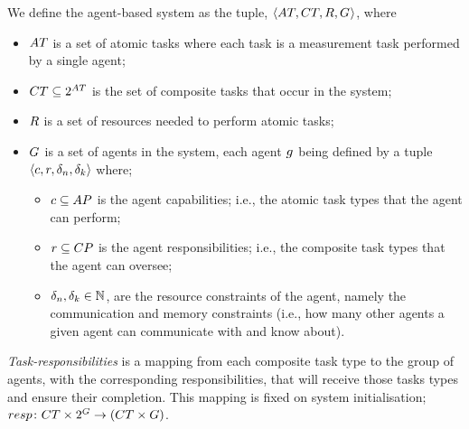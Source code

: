We define the agent-based system as the tuple, $\langle 
	\setAtomicTask{}{},
	\setCompositeTask{}{},
	\setResource{}{},
	\setAgents{}{}
\rangle$, where
\begin{itemize}
	\item $\setAtomicTask{}{}$ is a set of atomic tasks where each task is a measurement task performed by a single agent;
	\item $\setCompositeTask{}{} \subseteq \powerSetSymbol{\setAtomicTask{}{}}{}{}$ is the set of composite tasks that occur in the system;
	\item $\setResource{}{}$ is a set of resources needed to perform atomic tasks;
	\item $G_{}^{}$ is a set of agents in the system, each agent $g_{}^{}$ being defined by a tuple $\langle c,r, \delta_n, \delta_k \rangle$ where;
	\begin{itemize}
		\item $\varAgentCapability{}{}\subseteq \setAtomicTaskType{}{}$ is the agent capabilities; i.e., the atomic task types that the agent can perform;
		 \item $\varAgentResponsiblity{}{} \subseteq \setCompositeTaskType{}{}$ is the agent responsibilities; i.e., the composite task types that the agent can oversee;
		\item $\delta_n, \delta_k \in \mathbb{N}$, are the resource constraints of the agent, namely the communication and memory constraints (i.e., how many other agents a given agent can communicate with and know about).
	\end{itemize}
\end{itemize}

\newcommand{\formalTaskResponsibilities}[2]{
	\functionFormal{resp}
	{\setCompositeTask{}{} \times \powerSetAgent{}{}{}{}}
	({\setCompositeTask{}{} \times \setAgent{}{}})
}
\newcommand{\functionTaskResponsibilities}[2]{
	\functionSignature{resp}
	{\varCompositeTask{}{}, \setAgent{}{}}
}
\textit{Task-responsibilities} is a mapping from each composite task type to the group of agents, with the corresponding responsibilities, that will receive those tasks types and ensure their completion. This mapping is fixed on system initialisation; $\formalTaskResponsibilities{}{}$.

